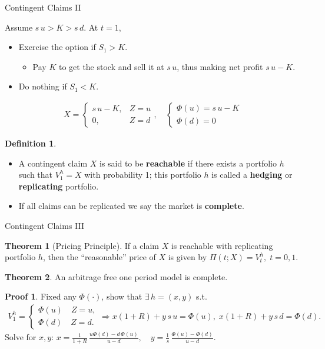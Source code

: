 \documentclass[10pt,handout]{beamer}
\newcommand{\ds}{\displaystyle}
\theoremstyle{definition}
\newtheorem*{dfn}{Definition}
\newtheorem*{thm}{Theorem}
\newtheorem*{prf}{Proof}
\begin{document}
\begin{frame}{Contingent Claims II}
  \begin{example}
    Assume $s\, u > K > s\, d$. At $t=1$, 
    \begin{itemize}
      \item Exercise the option if $S_1 > K$.
        \begin{itemize}
          \item Pay $K$ to get the stock and sell it at $s\,u$, thus making net profit $s\,u-K$.
        \end{itemize}
      \item Do nothing if $S_1 < K$.
    \end{itemize}
    \begin{align*}
      X = \begin{cases}s\,u - K, & Z=u \\ 0,  & Z=d\end{cases}, \quad\begin{cases}\Phi(u) = s\, u - K \\ \Phi(d) = 0\end{cases}
    \end{align*}
  \end{example}
  \begin{dfn}
    \begin{itemize}
      \item A contingent claim $X$ is said to be \textbf{reachable} if there exists a portfolio $h$ such that $V_1^h = X$ with probability 1; this portfolio $h$ is called a \textbf{hedging} or \textbf{replicating} portfolio. 
      \item If all claims can be replicated we say the market is \textbf{complete}.
    \end{itemize}
  \end{dfn}
\end{frame}

\begin{frame}{Contingent Claims III}
\begin{thm}[Pricing Principle]
  If a claim $X$ is reachable with replicating portfolio $h$, then the ``reasonable'' price of $X$ is given by $\ds\Pi(t; X) = V_t^h, \; t=0, 1.$
\end{thm}

\begin{thm}
  An arbitrage free one period model is complete.
\end{thm}

\begin{prf}
  Fixed any $\Phi(\cdot)$, show that $\exists\,h=(x, y)$ s.t.
  \begin{align*}
    V_1^h = \begin{cases}\Phi(u)\quad Z=u,\\ \Phi(d)\quad Z=d.\end{cases}\!\!\!\!\Longrightarrow x(1+R) + y\,s\,u = \Phi(u), \; x(1+R) + y\,s\,d = \Phi(d).
  \end{align*}
  Solve for $x, y$: $\ds x = \frac{1}{1+R}\,\frac{u\Phi(d)-d\,\Phi(u)}{u-d},\quad y = \frac{1}{s}\,\frac{\Phi(u)-\Phi(d)}{u-d}$.
\end{prf}
\end{frame}
\end{document}
